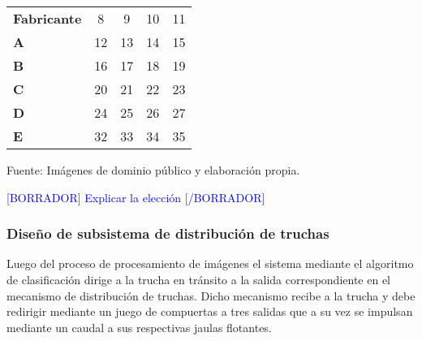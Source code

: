 \begin{mytable}[H]
\begin{tabular}{l|c|c|c|c|}
\begin{minipage}{\mythirdmaxsizeofcontenttable}
		\end{minipage} 
		\\ \hline
		\multicolumn{1}{|l|}{\textbf{Fabricante}} & 8                                                                     & 9          & 10         & 11         \\ \hline
		\multicolumn{1}{|l|}{\textbf{A}}          & 12                                                                    & 13         & 14         & 15         \\ \hline
		\multicolumn{1}{|l|}{\textbf{B}}          & 16                                                                    & 17         & 18         & 19         \\ \hline
		\multicolumn{1}{|l|}{\textbf{C}}          & 20                                                                    & 21         & 22         & 23         \\ \hline
		\multicolumn{1}{|l|}{\textbf{D}}          & 24                                                                    & 25         & 26         & 27         \\ \hline
		\multicolumn{1}{|l|}{\textbf{E}}          & 32                                                                    & 33         & 34         & 35         \\ \hline
	\end{tabular}
	\begin{flushleft}	
		Fuente: Imágenes de dominio público y elaboración propia.
	\end{flushleft}
\end{mytable}

\textcolor{blue}{[BORRADOR] Explicar la elección [/BORRADOR]}


\subsubsection{Diseño de subsistema de distribución de truchas}

Luego del proceso de procesamiento de imágenes el sistema mediante el algoritmo de clasificación dirige a la trucha en tránsito a la salida correspondiente en el mecanismo de distribución de truchas. Dicho mecanismo recibe a la trucha y debe redirigir mediante un juego de compuertas a tres salidas que a su vez se impulsan mediante un caudal a sus respectivas jaulas flotantes.

